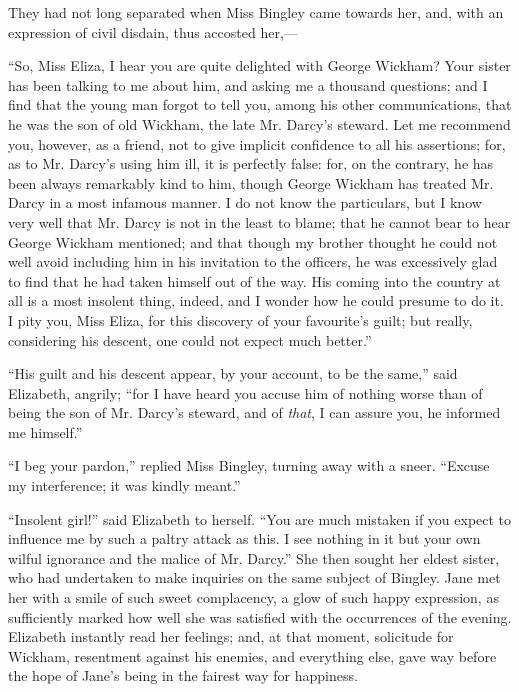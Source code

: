 They had not long separated when Miss Bingley came towards her, and, with an expression of civil disdain, thus accosted her,---

``So, Miss Eliza, I hear you are quite delighted with George Wickham? Your sister has been talking to me about him, and asking me a thousand questions; and I find that the young man forgot to tell you, among his other communications, that he was the son of old Wickham, the late Mr. Darcy's steward. Let me recommend you, however, as a friend, not to give implicit confidence to all his assertions; for, as to Mr. Darcy's using him ill, it is perfectly false: for, on the contrary, he has been always remarkably kind to him, though George Wickham has treated Mr. Darcy in a most infamous manner. I do not know the particulars, but I know very well that Mr. Darcy is not in the least to blame; that he cannot bear to hear George Wickham mentioned; and that though my brother thought he could not well avoid including him in his invitation to the officers, he was excessively glad to find that he had taken himself out of the way. His coming into the country at all is a most insolent thing, indeed, and I wonder how he could presume to do it. I pity you, Miss Eliza, for this discovery of your favourite's guilt; but really, considering his descent, one could not expect much better.''

``His guilt and his descent appear, by your account, to be the same,'' said Elizabeth, angrily; ``for I have heard you accuse him of nothing worse than of being the son of Mr. Darcy's steward, and of \textit{that}, I can assure you, he informed me himself.''

``I beg your pardon,'' replied Miss Bingley, turning away with a sneer. ``Excuse my interference; it was kindly meant.''

``Insolent girl!'' said Elizabeth to herself. ``You are much mistaken if you expect to influence me by such a paltry attack as this. I see nothing in it but your own wilful ignorance and the malice of Mr. Darcy.'' She then sought her eldest sister, who had undertaken to make inquiries on the same subject of Bingley. Jane met her with a smile of such sweet complacency, a glow of such happy expression, as sufficiently marked how well she was satisfied with the occurrences of the evening. Elizabeth instantly read her feelings; and, at that moment, solicitude for Wickham, resentment against his enemies, and everything else, gave way before the hope of Jane's being in the fairest way for happiness.

